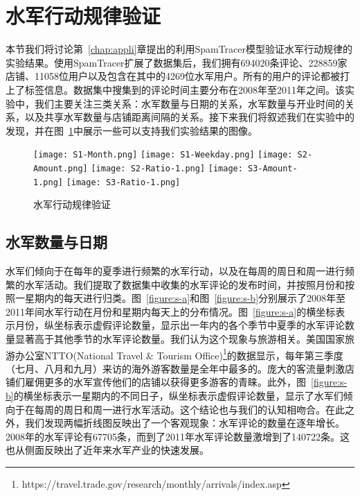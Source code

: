 \section{水军行动规律验证}

本节我们将讨论第~\ref{chap:appli}章提出的利用SpamTracer模型验证水军行动规律的实验结果。使用SpamTracer扩展了数据集后，我们拥有694020条评论、228859家店铺、11058位用户以及包含在其中的4269位水军用户。所有的用户的评论都被打上了标签信息。数据集中搜集到的评论时间主要分布在2008年至2011年之间。该实验中，我们主要关注三类关系：水军数量与日期的关系，水军数量与开业时间的关系，以及共享水军数量与店铺距离间隔的关系。接下来我们将叙述我们在实验中的发现，并在图~\ref{fig:S}中展示一些可以支持我们实验结果的图像。

\begin{figure}[htp]
	{\texttt{[image: S1-Month.png]}}
	\hspace{4em}
	{\texttt{[image: S1-Weekday.png]}}
	\hspace{4em}
	{\texttt{[image: S2-Amount.png]}}
	\hspace{4em}
	{\texttt{[image: S2-Ratio-1.png]}}
	\hspace{4em}
	{\texttt{[image: S3-Amount-1.png]}}
	\hspace{4em}
	{\texttt{[image: S3-Ratio-1.png]}}
	\caption[水军行动规律验证]{水军行动规律验证}
	\label{fig:S}
\end{figure}

\subsection{水军数量与日期}

水军们倾向于在每年的夏季进行频繁的水军行动，以及在每周的周日和周一进行频繁的水军活动。我们提取了数据集中收集的水军评论的发布时间，并按照月份和按照一星期内的每天进行归类。图~\ref{figure:s-a}和图~\ref{figure:s-b}分别展示了2008年至2011年间水军行动在月份和星期内每天上的分布情况。图~\ref{figure:s-a}的横坐标表示月份，纵坐标表示虚假评论数量，显示出一年内的各个季节中夏季的水军评论数量显著高于其他季节的水军评论数量。我们认为这个现象与旅游相关。美国国家旅游办公室NTTO(National Travel \& Tourism Office)\footnote{https://travel.trade.gov/research/monthly/arrivals/index.asp}的数据显示，每年第三季度（七月、八月和九月）来访的海外游客数量是全年中最多的。庞大的客流量刺激店铺们雇佣更多的水军宣传他们的店铺以获得更多游客的青睐。此外，图~\ref{figure:s-b}的横坐标表示一星期内的不同日子，纵坐标表示虚假评论数量，显示了水军们倾向于在每周的周日和周一进行水军活动。这个结论也与我们的认知相吻合。在此之外，我们发现两幅折线图反映出了一个客观现象：水军评论的数量在逐年增长。2008年的水军评论有67705条，而到了2011年水军评论数量激增到了140722条。这也从侧面反映出了近年来水军产业的快速发展。



